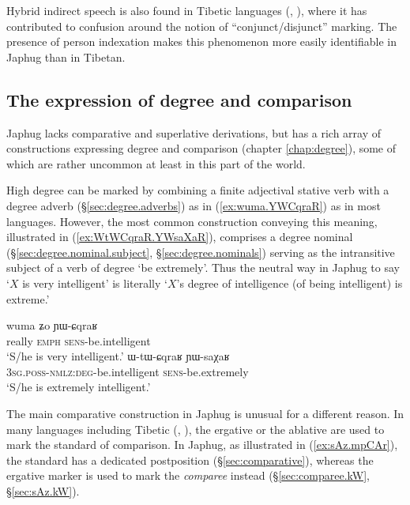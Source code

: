 Hybrid indirect speech is also found in  Tibetic languages (\citealt{tournadre08conjunct}, \citealt[§8.4.3.8]{tournadre21tibetic}), where it has contributed to confusion around the notion of ``conjunct/disjunct'' marking. The presence of person indexation makes this phenomenon more easily identifiable in Japhug than in Tibetan.
 
\subsection{The expression of degree and comparison}
Japhug lacks comparative and superlative derivations, but has a rich array of constructions  expressing degree and comparison (chapter \ref{chap:degree}), some of which are rather uncommon at least in this part of the world.

High degree can be marked by combining a finite adjectival stative verb with a degree adverb (§\ref{sec:degree.adverbs}) as in (\ref{ex:wuma.YWCqraR}) as in most languages. However, the most common construction conveying this meaning, illustrated in (\ref{ex:WtWCqraR.YWsaXaR}), comprises a degree nominal (§\ref{sec:degree.nominal.subject}, §\ref{sec:degree.nominals}) serving as the intransitive subject of a verb of degree `be extremely'. Thus the neutral way in Japhug to say `$X$ is very intelligent' is literally `$X$'s degree of intelligence (of being intelligent) is extreme.'

\begin{exe} 
\ex 
\begin{xlist}
\ex \label{ex:wuma.YWCqraR}
\gll wuma ʑo ɲɯ-ɕqraʁ \\
really \textsc{emph} \textsc{sens}-be.intelligent \\
\glt `S/he is very intelligent.' 
\ex \label{ex:WtWCqraR.YWsaXaR}
\gll ɯ-tɯ-ɕqraʁ ɲɯ-saχaʁ \\
\textsc{3sg}.\textsc{poss}-\textsc{nmlz}:\textsc{deg}-be.intelligent \textsc{sens}-be.extremely \\
\glt `S/he is extremely intelligent.'  
\end{xlist}
\end{exe} 

The main comparative construction in Japhug is unusual for a different reason. In many languages including Tibetic (\citealt[239]{vbrugmo03maqu}, \citealt[29]{heine-kuteva02}), the ergative or the  ablative are used to mark the standard of comparison. In Japhug, as illustrated in (\ref{ex:sAz.mpCAr}), the standard has a dedicated postposition (§\ref{sec:comparative}), whereas the ergative marker  is used to mark the \textit{comparee} instead (§\ref{sec:comparee.kW}, §\ref{sec:sAz.kW}). 


